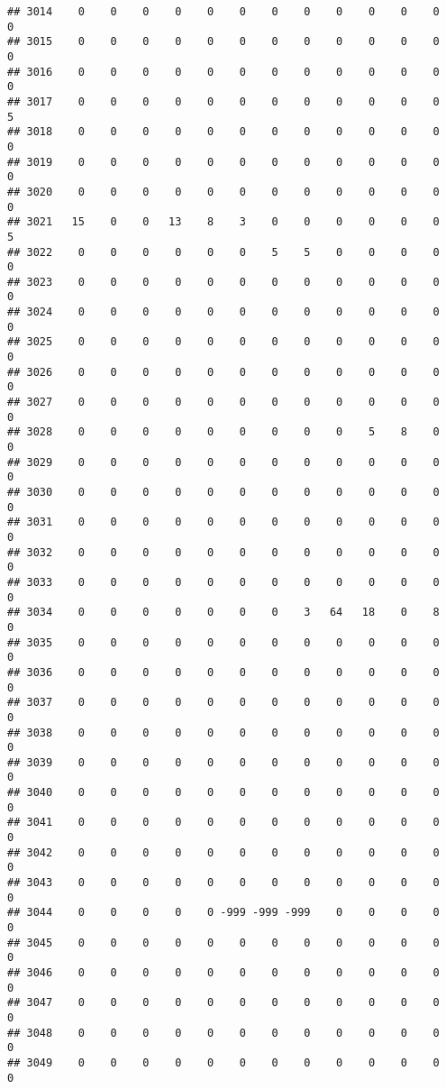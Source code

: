 \documentclass[]{article}
\begin{document}
\begin{verbatim}
## 3014    0    0    0    0    0    0    0    0    0    0    0    0    0
## 3015    0    0    0    0    0    0    0    0    0    0    0    0    0
## 3016    0    0    0    0    0    0    0    0    0    0    0    0    0
## 3017    0    0    0    0    0    0    0    0    0    0    0    0    5
## 3018    0    0    0    0    0    0    0    0    0    0    0    0    0
## 3019    0    0    0    0    0    0    0    0    0    0    0    0    0
## 3020    0    0    0    0    0    0    0    0    0    0    0    0    0
## 3021   15    0    0   13    8    3    0    0    0    0    0    0    5
## 3022    0    0    0    0    0    0    5    5    0    0    0    0    0
## 3023    0    0    0    0    0    0    0    0    0    0    0    0    0
## 3024    0    0    0    0    0    0    0    0    0    0    0    0    0
## 3025    0    0    0    0    0    0    0    0    0    0    0    0    0
## 3026    0    0    0    0    0    0    0    0    0    0    0    0    0
## 3027    0    0    0    0    0    0    0    0    0    0    0    0    0
## 3028    0    0    0    0    0    0    0    0    0    5    8    0    0
## 3029    0    0    0    0    0    0    0    0    0    0    0    0    0
## 3030    0    0    0    0    0    0    0    0    0    0    0    0    0
## 3031    0    0    0    0    0    0    0    0    0    0    0    0    0
## 3032    0    0    0    0    0    0    0    0    0    0    0    0    0
## 3033    0    0    0    0    0    0    0    0    0    0    0    0    0
## 3034    0    0    0    0    0    0    0    3   64   18    0    8    0
## 3035    0    0    0    0    0    0    0    0    0    0    0    0    0
## 3036    0    0    0    0    0    0    0    0    0    0    0    0    0
## 3037    0    0    0    0    0    0    0    0    0    0    0    0    0
## 3038    0    0    0    0    0    0    0    0    0    0    0    0    0
## 3039    0    0    0    0    0    0    0    0    0    0    0    0    0
## 3040    0    0    0    0    0    0    0    0    0    0    0    0    0
## 3041    0    0    0    0    0    0    0    0    0    0    0    0    0
## 3042    0    0    0    0    0    0    0    0    0    0    0    0    0
## 3043    0    0    0    0    0    0    0    0    0    0    0    0    0
## 3044    0    0    0    0    0 -999 -999 -999    0    0    0    0    0
## 3045    0    0    0    0    0    0    0    0    0    0    0    0    0
## 3046    0    0    0    0    0    0    0    0    0    0    0    0    0
## 3047    0    0    0    0    0    0    0    0    0    0    0    0    0
## 3048    0    0    0    0    0    0    0    0    0    0    0    0    0
## 3049    0    0    0    0    0    0    0    0    0    0    0    0    0

\end{verbatim}
\end{document}
